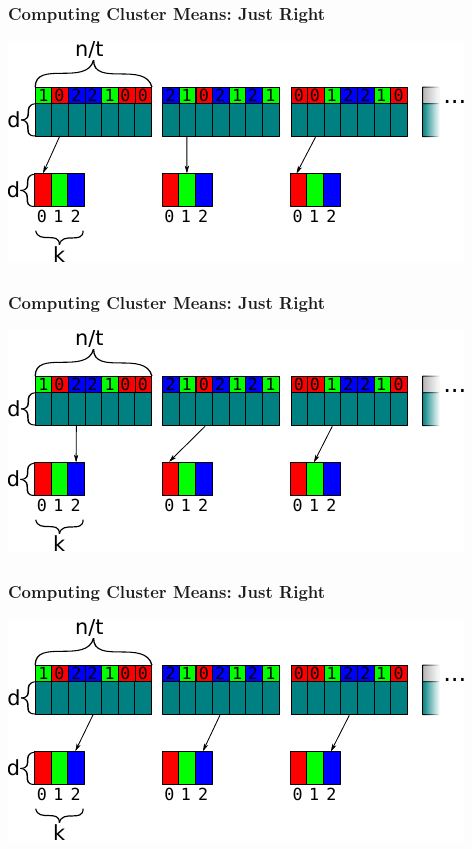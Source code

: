 \documentclass[rgb,dvipsnames]{beamer}
\begin{document}
\begin{frame}[fragile]
  \frametitle{Computing Cluster Means: Just Right}

  \begin{center}
\includegraphics[width=\textwidth]{img/cluster_means_chunked_1.pdf}
\end{center}
\end{frame}

\begin{frame}[fragile]
  \frametitle{Computing Cluster Means: Just Right}

  \begin{center}
\includegraphics[width=\textwidth]{img/cluster_means_chunked_2.pdf}
\end{center}
\end{frame}

\begin{frame}[fragile]
  \frametitle{Computing Cluster Means: Just Right}

  \begin{center}
\includegraphics[width=\textwidth]{img/cluster_means_chunked_3.pdf}
\end{center}
\end{frame}
\end{document}
